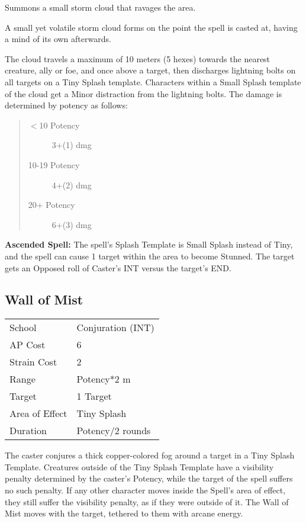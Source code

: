 \documentclass[11pt,a4paper,twocolumn]{book}
\begin{document}
\medskip

Summons a small storm cloud that ravages the area.

A small yet volatile storm cloud forms on the point the spell is casted at, having a mind of its own afterwards.

The cloud travels a maximum of 10 meters (5 hexes) towards the nearest creature, ally or foe, and once above a target, then discharges lightning bolts on all targets on a Tiny Splash template. Characters within a Small Splash template of the cloud get a Minor distraction from the lightning bolts. The damage is determined by potency as follows:

\begin{quote}
	\begin{description}
		\item[$<$10 Potency] 	3+(1) dmg
		\item[10-19 Potency] 	4+(2) dmg
		\item[20+ Potency] 		6+(3) dmg
	\end{description}	
\end{quote}

\textbf{Ascended Spell:} The spell's Splash Template is Small Splash instead of Tiny, and the spell can cause 1 target within the area to become Stunned. The target gets an Opposed roll of Caster's INT versus the target's END.


\subsection*{Wall of Mist}
{
	\begin{tabu} to 75mm{| X[l,4] | X[l,7] |}
		\hline
		School 			& Conjuration (INT) 			\\
		AP Cost	      	& 6 							\\
		Strain Cost     & 2 							\\
		Range     		& Potency*2 m					\\
		Target      	& 1 Target						\\
		Area of Effect  & Tiny Splash 	 			    \\
		Duration     	& Potency/2 rounds				\\ \hline
	\end{tabu}
	
}

\medskip

The caster conjures a thick copper-colored fog around a target in a Tiny Splash Template. Creatures outside of the Tiny Splash Template have a visibility penalty determined by the caster's Potency, while the target of the spell suffers no such penalty. If any other character moves inside the Spell's area of effect, they still suffer the visibility penalty, as if they were outside of it. The Wall of Mist moves with the target, tethered to them with arcane energy.
\end{document}
